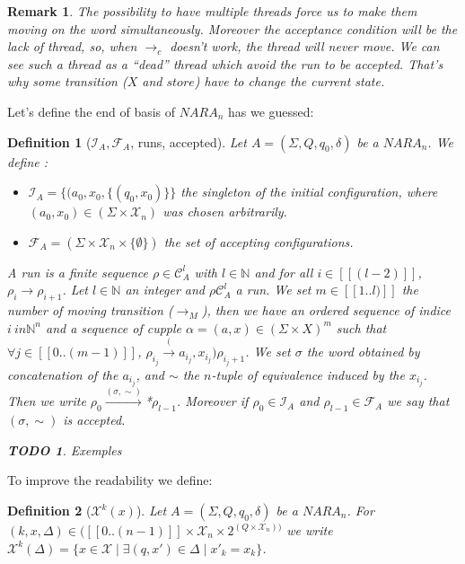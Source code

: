 \documentclass[a4paper,10pt]{report}
\newtheorem{df}{Definition}
\newtheorem{rk}{Remark}
\newtheorem{td}{TODO}
\newcommand{\seg}[1]{[\![#1]\!]}
\newcommand{\ts}{\seg{0 .. (n-1)}}
\newcommand{\C}{\mathcal{C}_{A}}
\newcommand{\I}{\mathcal{I}_{A}}
\newcommand{\F}{\mathcal{F}_{A}}
\newcommand{\Xa}{\mathcal{X}}
\newcommand{\X}{\mathcal{X}_{n}}
\begin{document}
\begin{rk}
  \label{dead}
  The possibility to have multiple threads force us to make them moving on the word simultaneously. 
  Moreover the acceptance condition will be the lack of thread, so, when $\rightarrow_c$ doesn't work, the thread will never move.
  We can see such a thread as a ``dead'' thread which avoid the run to be accepted.
  That's why some transition ($X$ and $store$) have to change the current state.
\end{rk}
Let's define the end of basis of $NARA_n$ has we guessed:
\begin{df}[$\I,\F$, runs, accepted]
Let $A = (\Sigma ,Q ,q_0, \delta )$ be a $NARA_n$. We define :
\begin{itemize}
 \item $\I = \{(a_0,x_0,\{(q_0,x_0)\}\}$  the singleton of the initial configuration, where $(a_0,x_0) \in (\Sigma \times \X)$ was chosen arbitrarily.
 \item $\F = (\Sigma \times \X \times \{\emptyset\})$ the set of accepting configurations.
\end{itemize}
A run is a finite sequence $\rho \in \C^l$ with $l \in \mathbb N$ and for all $i \in \seg{(l-2)}$, $\rho_i \rightarrow \rho_{i+1}$.
Let $l \in \mathbb N$  an integer and $\rho \C^l$ a run.
We set $m \in \seg{1..l)}$ the number of moving transition ($\rightarrow_M$), then we have an ordered sequence of indice $i \ in {\mathbb N}^n$ and a sequence of cupple $\alpha = (a,x) \in {(\Sigma \times X)}^m $
such that $\forall j \in \seg{0..(m-1)}$, $\rho_{i_j} \xrightarrow(a_{i_j},x_{i_j}) \rho_{i_j+1}$.
We set $\sigma$ the word obtained by concatenation of the $a_{i_j}$, and $\sim$ the $n$-tuple of equivalence induced by the $x_{i_j}$.
Then we write $\rho_0 \xrightarrow{(\sigma,\sim)}$*$ \rho_{l-1}$.
Moreover if $\rho_0 \in \I$ and $\rho_{l-1} \in \F$ we say that $(\sigma,\sim)$ is accepted.



\begin{td}
  Exemples
\end{td}


\end{df}

To improve the readability we define:
\begin{df}[$\Xa^k(x)$]
  Let $A = (\Sigma ,Q ,q_0, \delta )$ be a $NARA_n$.
  For $(k,x,\Delta) \in (\ts \times \X \times 2^{(Q\times \X)) } $ we write $\Xa^k(\Delta) = \{x \in \Xa \mid \exists (q,x') \in \Delta \mid x'_k = x_k\}$.
\end{df}
\end{document}
